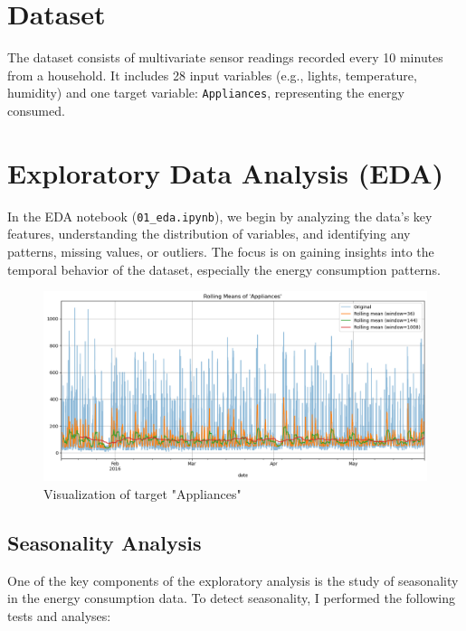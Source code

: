 \documentclass{article}
\begin{document}
\section{Dataset}
The dataset consists of multivariate sensor readings recorded every 10 minutes from a household. It includes 28 input variables (e.g., lights, temperature, humidity) and one target variable: \texttt{Appliances}, representing the energy consumed.

\section{Exploratory Data Analysis (EDA)}

In the EDA notebook (\texttt{01\_eda.ipynb}), we begin by analyzing the data's key features, understanding the distribution of variables, and identifying any patterns, missing values, or outliers. The focus is on gaining insights into the temporal behavior of the dataset, especially the energy consumption patterns.

\begin{figure}[h!]
    \centering
    \includegraphics[width=1.0\textwidth]{pics/Appliances.png}
    \caption{Visualization of target "Appliances"}
\end{figure}

\subsection{Seasonality Analysis}
One of the key components of the exploratory analysis is the study of seasonality in the energy consumption data. To detect seasonality, I performed the following tests and analyses:
\end{document}
